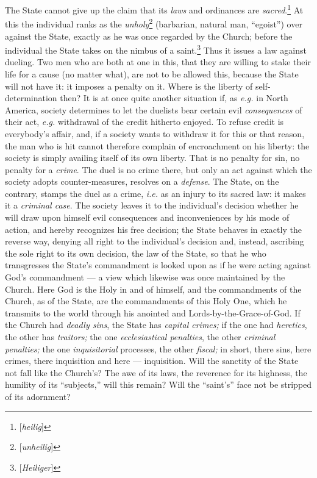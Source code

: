 The State cannot give up the claim that its \textit{laws} and ordinances are 
\textit{sacred}.\footnote{[\textit{heilig}]} At this the individual ranks as 
the \textit{unholy}\footnote{[\textit{unheilig}]} (barbarian, natural man, 
``egoist'') over against the State, exactly as he was once regarded by the 
Church; before the individual the State takes on the nimbus of a 
saint.\footnote{[\textit{Heiliger}]} Thus it issues a law against dueling. Two 
men who are both at one in this, that they are willing to stake their life for 
a cause (no matter what), are not to be allowed this, because the State will 
not have it: it imposes a penalty on it. Where is the liberty of 
self-determination then? It is at once quite another situation if, as 
\textit{e.g.} in North America, society determines to let the duelists bear 
certain evil \textit{consequences} of their act, \textit{e.g.} withdrawal of 
the credit hitherto enjoyed. To refuse credit is everybody's affair, and, if a 
society wants to withdraw it for this or that reason, the man who is hit 
cannot therefore complain of encroachment on his liberty: the society is 
simply availing itself of its own liberty. That is no penalty for sin, no 
penalty for a \textit{crime}. The duel is no crime there, but only an act 
against which the society adopts counter-measures, resolves on a 
\textit{defense}. The State, on the contrary, stamps the duel as a crime, 
\textit{i.e.} as an injury to its sacred law: it makes it a \textit{criminal 
case}. The society leaves it to the individual's decision whether he will draw 
upon himself evil consequences and inconveniences by his mode of action, and 
hereby recognizes his free decision; the State behaves in exactly the reverse 
way, denying all right to the individual's decision and, instead, ascribing 
the sole right to its own decision, the law of the State, so that he who 
transgresses the State's commandment is looked upon as if he were acting 
against God's commandment --- a view which likewise was once maintained by the 
Church. Here God is the Holy in and of himself, and the commandments of the 
Church, as of the State, are the commandments of this Holy One, which he 
transmits to the world through his anointed and Lords-by-the-Grace-of-God. If 
the Church had \textit{deadly sins}, the State has \textit{capital crimes;} if 
the one had \textit{heretics}, the other has \textit{traitors;} the one 
\textit{ecclesiastical penalties}, the other \textit{criminal penalties;} the 
one \textit{inquisitorial} processes, the other \textit{fiscal;} in short, 
there sins, here crimes, there inquisition and here --- inquisition. Will the 
sanctity of the State not fall like the Church's? The awe of its laws, the 
reverence for its highness, the humility of its ``subjects,'' will this 
remain? Will the ``saint's'' face not be stripped of its adornment?

